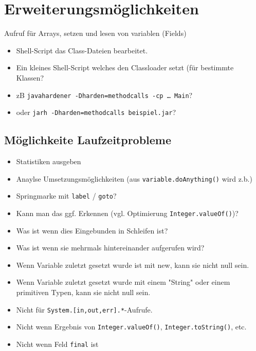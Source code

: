 
\chapter{Erweiterungsmöglichkeiten}

Aufruf für Arrays, setzen und lesen von variablen (Fields)

\begin{itemize}
\item Shell-Script das Class-Dateien bearbeitet.
\item Ein kleines Shell-Script welches den Classloader setzt (für bestimmte Klassen?
\item zB \texttt{javahardener -Dharden=methodcalls -cp … Main}?
\item oder \texttt{jarh -Dharden=methodcalls beispiel.jar}?
\end{itemize}

\section{Möglichkeite Laufzeitprobleme}


\begin{itemize}
\item Statistiken ausgeben
\item Anaylse Umsetzungsmöglichkeiten (aus \texttt{variable.doAnything()} wird z.b.)
\item Springmarke mit \texttt{label} / \texttt{goto}?
\item Kann man das ggf. Erkennen (vgl. Optimierung \texttt{Integer.valueOf()})?
\item Was ist wenn dies Eingebunden in Schleifen ist?
\item Was ist wenn sie mehrmals hintereinander aufgerufen wird?
\item Wenn Variable zuletzt gesetzt wurde ist mit new, kann sie nicht null sein.
\item Wenn Variable zuletzt gesetzt wurde mit einem "String" oder einem primitiven Typen, kann sie nicht null sein.
\item Nicht für \texttt{System.[in,out,err].*}-Aufrufe.
\item Nicht wenn Ergebnis von \texttt{Integer.valueOf()}, \texttt{Integer.toString()}, etc.
\item Nicht wenn Feld \texttt{final} ist
\end{itemize}


